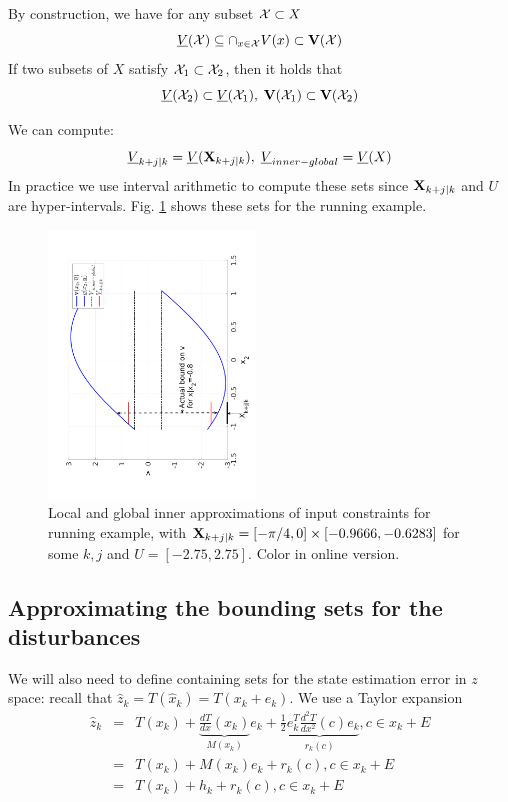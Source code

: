 By construction, we have for any subset $\mathcal{X} \subset X$
\begin{equation}
\label{eq:Vbounds}
\underline{V}(\mathcal{X}) \subseteq \cap_{x \in \mathcal{X}} V(x) \subset \mathbf{V}(\mathcal{X})
\end{equation}
If two subsets of $X$ satisfy $\mathcal{X}_1 \subset \mathcal{X}_2$, then it holds that 
\begin{equation}
\label{eq:V inclusions}
\underline{V}(\mathcal{X}_2) \subset \underline{V}(\mathcal{X}_1), \; \mathbf{V}(\mathcal{X}_1) \subset \mathbf{V}(\mathcal{X}_2)
\end{equation}

We can compute:
\begin{equation}
\label{eq:Vkj Vmax}
\underline{V}_{k+j|k}  = \underline{V}(\mathbf{X}_{k+j|k}), \; \underline{V}_{inner-global} = \underline{V}(X)
\end{equation}
In practice we use interval arithmetic to compute these sets since $\mathbf{X}_{k+j|k}$ and $U$ are hyper-intervals.
Fig. \ref{fig:err bounds toy} shows these sets for the running example.
\begin{figure}
	\includegraphics[angle=270,width=0.49\textwidth]{figs/InputToy.pdf}
	\caption{Local and global inner approximations of input constraints for running example, with $\mathbf{X}_{k+j|k} =  [-\pi/4,0]\times[-0.9666,-0.6283]$ for some $k,j$ and $U = [-2.75,2.75]$. Color in online version.}
	\label{fig:err bounds toy}
\end{figure}


\subsection{Approximating the bounding sets for the disturbances}
\label{sec:approx dist}
We will also need to define containing sets for the state estimation error in $z$ space:
recall that $\hat{z}_k = T(\hat{x}_k) = T(x_k+e_k)$. 
We use a Taylor expansion
\begin{eqnarray}
\label{eq:taylor expansion T}
\hat{z}_k &=& T(x_k) + \underbrace{\frac{dT}{dx}(x_k)}_{M(x_k)}e_k+ \underbrace{\frac{1}{2}e_k^T \frac{d^2T}{dx^2}(c)e_k}_{r_k(c)}, c \in x_k + E \nonumber 
\\
&=& T(x_k) + M(x_k)e_k+ r_k(c), c \in x_k + E \nonumber
\\
&=& T(x_k) + h_{k}+ r_k(c), c \in x_k + E \nonumber
\end{eqnarray}

